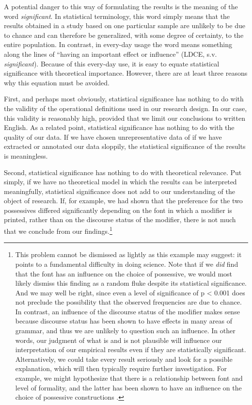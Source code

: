 A potential danger to this way of formulating the results is the meaning of the word \textit{significant}. In statistical terminology, this word simply means that the results obtained in a study based on one particular sample are unlikely to be due to chance and can therefore be generalized, with some degree of certainty, to the entire population. In contrast, in every-day usage the word means something along the lines of ``having an important effect or influence'' (LDCE, s.v. \textit{significant}). Because of this every-day use, it is easy to equate statistical significance with theoretical importance. However, there are at least three reasons why this equation must be avoided.

First, and perhaps most obviously, statistical significance has nothing to do with the validity of the operational definitions used in our research design. In our case, this validity is reasonably high, provided that we limit our conclusions to written English. As a related point, statistical significance has nothing to do with the quality of our data. If we have chosen unrepresentative data of if we have extracted or annotated our data sloppily, the statistical significance of the results is meaningless. 

Second, statistical significance has nothing to do with theoretical relevance. Put simply, if we have no theoretical model in which the results can be interpreted meaningfully, statistical significance does not add to our understanding of the object of research. If, for example, we had shown that the preference for the two possessives differed significantly depending on the font in which a modifier is printed, rather than on the discourse status of the modifier, there is not much that we conclude from our findings.\footnote{This problem cannot be dismissed as lightly as this example may suggest: it points to a fundamental difficulty in doing science. Note that if we \textit{did} find that the font has an influence on the choice of possessive, we would most likely dismiss this finding as a random fluke despite its statistical significance. And we may well be right, since even a level of significance of p < 0.001 does not preclude the possibility that the observed frequencies are due to chance. In contrast, an influence of the discourse status of the modifier makes sense because discourse status has been shown to have effects in many areas of grammar, and thus we are unlikely to question such an influence. In other words, our judgment of what is and is not plausible will influence our interpretation of our empirical results even if they are statistically significant. Alternatively, we could take every result seriously and look for a possible explanation, which will then typically require further investigation. For example, we might hypothesize that there is a relationship between font and level of formality, and the latter has been shown to have an influence on the choice of possessive constructions \citep{jucker_genitive_1993}.}

